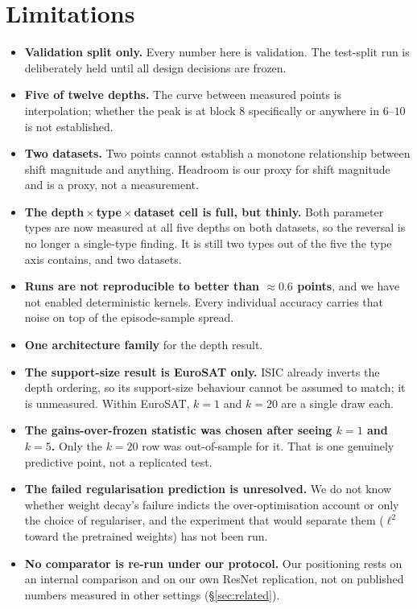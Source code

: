 \documentclass[11pt]{article}
\begin{document}
\section{Limitations}
\label{sec:limitations}

\begin{itemize}
  \item \textbf{Validation split only.} Every number here is validation. The test-split
    run is deliberately held until all design decisions are frozen.
  \item \textbf{Five of twelve depths.} The curve between measured points is
    interpolation; whether the peak is at block 8 specifically or anywhere in $6$--$10$
    is not established.
  \item \textbf{Two datasets.} Two points cannot establish a monotone relationship
    between shift magnitude and anything. Headroom is our proxy for shift magnitude and
    is a proxy, not a measurement.
  \item \textbf{The depth\,$\times$\,type\,$\times$\,dataset cell is full, but thinly.}
    Both parameter types are now measured at all five depths on both datasets, so the
    reversal is no longer a single-type finding. It is still two types out of the five
    the type axis contains, and two datasets.
  \item \textbf{Runs are not reproducible to better than $\approx 0.6$ points}, and we
    have not enabled deterministic kernels. Every individual accuracy carries that noise
    on top of the episode-sample spread.
  \item \textbf{One architecture family} for the depth result.
  \item \textbf{The support-size result is EuroSAT only.} ISIC already inverts the
    depth ordering, so its support-size behaviour cannot be assumed to match; it is
    unmeasured. Within EuroSAT, $k=1$ and $k=20$ are a single draw each.
  \item \textbf{The gains-over-frozen statistic was chosen after seeing $k=1$ and
    $k=5$.} Only the $k=20$ row was out-of-sample for it. That is one genuinely
    predictive point, not a replicated test.
  \item \textbf{The failed regularisation prediction is unresolved.} We do not know
    whether weight decay's failure indicts the over-optimisation account or only the
    choice of regulariser, and the experiment that would separate them ($\ell^2$
    toward the pretrained weights) has not been run.
  \item \textbf{No comparator is re-run under our protocol.} Our positioning rests on
    an internal comparison and on our own ResNet replication, not on published numbers
    measured in other settings (\S\ref{sec:related}).
\end{itemize}
\end{document}
